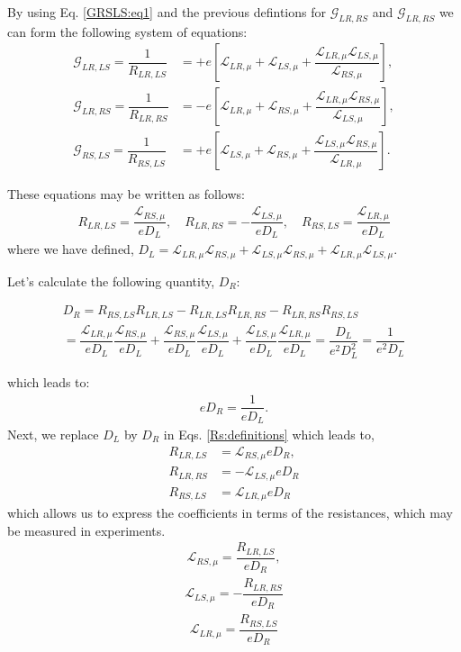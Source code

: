 By using Eq. \eqref{GRSLS:eq1} and the previous defintions for $\mathcal{G}_{LR,RS}$ and $\mathcal{G}_{LR,RS}$ we can form the following system of equations:
\begin{align*}
\mathcal{G}_{LR,LS}=\dfrac{1}{{R}_{LR,LS}}
&=
+e\left[\mathcal{L}_{LR,\mu} + \mathcal{L}_{LS,\mu} +\dfrac{\mathcal{L}_{LR,\mu} \mathcal{L}_{LS,\mu}}{\mathcal{L}_{RS,\mu}}\right],
\\
\mathcal{G}_{LR,RS}=\dfrac{1}{{R}_{LR,RS}}
&=
-e\left[\mathcal{L}_{LR,\mu}
+\mathcal{L}_{RS,\mu}+\dfrac{
\mathcal{L}_{LR,\mu} \mathcal{L}_{RS,\mu} }{\mathcal{L}_{LS,\mu}}\right],
\\
\mathcal{G}_{RS,LS}=\dfrac{1}{{R}_{RS,LS}}&=
+e\left[\mathcal{L}_{LS,\mu}+\mathcal{L}_{RS,\mu}+\dfrac{\mathcal{L}_{LS,\mu} \mathcal{L}_{RS,\mu}}{\mathcal{L}_{LR,\mu}}\right].
\end{align*}

These equations may be written as follows:
\begin{align}\label{Rs:definitions}
R_{LR,LS}
=
\dfrac{\mathcal{L}_{RS,\mu}}{eD_{L}},
\quad
R_{LR,RS}=-\dfrac{\mathcal{L}_{LS,\mu}}{eD_{L}},
\quad
R_{RS,LS}=\dfrac{\mathcal{L}_{LR,\mu}}{eD_{L}}
\end{align}
where we have defined,
$D_{L}=\mathcal{L}_{LR,\mu}\mathcal{L}_{RS,\mu} + \mathcal{L}_{LS,\mu}\mathcal{L}_{RS,\mu} +\mathcal{L}_{LR,\mu}\mathcal{L}_{LS,\mu}$.

Let's calculate the following quantity, $D_{R}$:
\begin{widetext}
\begin{multline}\label{DR:def}
D_{R}=R_{RS,LS}R_{LR,LS}
-
R_{LR,LS}R_{LR,RS}
-
R_{LR,RS}R_{RS,LS}
\\=
\dfrac{\mathcal{L}_{LR,\mu}}{eD_{L}}
\dfrac{\mathcal{L}_{RS,\mu}}{eD_{L}}
+
\dfrac{\mathcal{L}_{RS,\mu}}{eD_{L}}
\dfrac{\mathcal{L}_{LS,\mu}}{eD_{L}}
+
\dfrac{\mathcal{L}_{LS,\mu}}{eD_{L}}
\dfrac{\mathcal{L}_{LR,\mu}}{eD_{L}}
=
\dfrac{D_{L}}{e^{2}D^{2}_{L}}=\dfrac{1}{e^{2}D_{L}}
\end{multline}
\end{widetext}
which leads to:
\begin{align}\label{DR:def:2}
eD_{R}=\dfrac{1}{eD_{L}}.
\end{align}
\clearpage
Next, we replace $D_{L}$ by $D_{R}$ in Eqs. \eqref{Rs:definitions} which leads to,
\begin{align*}
R_{LR,LS}
&=
\mathcal{L}_{RS,\mu}eD_{R},
\\
R_{LR,RS}
&=-\mathcal{L}_{LS,\mu}eD_{R}
\\
R_{RS,LS}
&=\mathcal{L}_{LR,\mu}eD_{R}
\end{align*}
which allows us to express the coefficients in terms of the resistances, which may be measured in experiments. 
\begin{align}\label{LRS:exp}
\mathcal{L}_{RS,\mu}=\dfrac{R_{LR,LS}}{eD_{R}},
\end{align}
\begin{align}\label{LLS:exp}
\mathcal{L}_{LS,\mu}=-\dfrac{R_{LR,RS}}{eD_{R}}
\end{align}
\begin{align}\label{LLR:exp}
\mathcal{L}_{LR,\mu}=\dfrac{R_{RS,LS}}{eD_{R}}
\end{align}